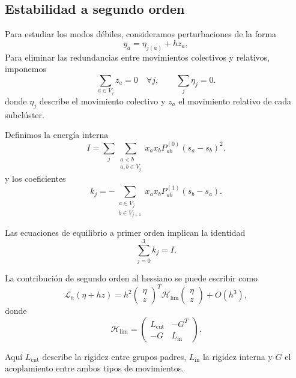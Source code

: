 \subsection{Estabilidad a segundo orden}

Para estudiar los modos débiles, consideramos
perturbaciones de la forma
\begin{equation}
    y_a=\eta_{j(a)}+hz_a,
\end{equation}
Para eliminar las redundancias entre movimientos
colectivos y relativos, imponemos
\[
    \sum_{a\in V_j}z_a=0
    \quad\forall j,
    \qquad
    \sum_j\eta_j=0.
\]
donde $\eta_j$ describe el movimiento colectivo
y $z_a$ el movimiento relativo de cada subclúster.

Definimos la energía interna
\begin{equation}
    I=
    \sum_j\sum_{\substack{a<b\\a,b\in V_j}}
    x_ax_bP_{ab}^{(0)}(s_a-s_b)^2.
\end{equation}
y los coeficientes
\begin{equation}
    k_j=
    -\sum_{\substack{a\in V_j\\b\in V_{j+1}}}
    x_ax_bP_{ab}^{(1)}(s_b-s_a).
\end{equation}

Las ecuaciones de equilibrio a primer orden
implican la identidad
\begin{equation}
    \sum_{j=0}^{3}k_j=I.
\end{equation}

La contribución de segundo orden al hessiano
se puede escribir como
\begin{equation}
    \mathcal{L}_h(\eta+hz)
    =
    h^2
    \begin{pmatrix}\eta\\z\end{pmatrix}^{T}
    \mathcal{H}_{\mathrm{lim}}
    \begin{pmatrix}\eta\\z\end{pmatrix}
    +O(h^3),
\end{equation}
donde
\begin{equation}
    \mathcal{H}_{\mathrm{lim}}=
    \begin{pmatrix}
        L_{\mathrm{cut}} & -G^T\\
        -G & L_{\mathrm{in}}
    \end{pmatrix}.
\end{equation}

Aquí $L_{\mathrm{cut}}$ describe la rigidez
entre grupos padres, $L_{\mathrm{in}}$ la rigidez
interna y $G$ el acoplamiento entre ambos tipos
de movimientos.

